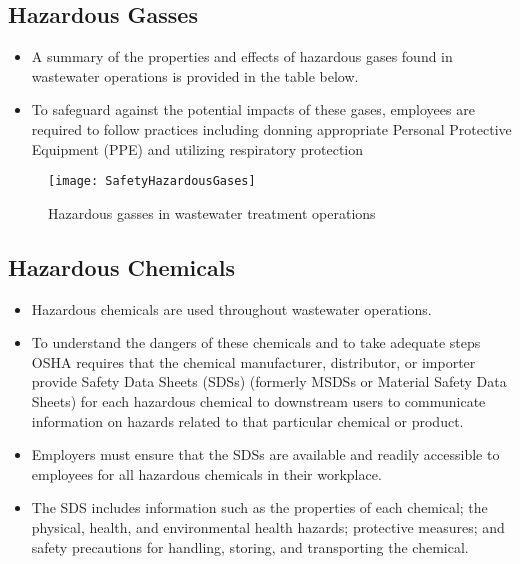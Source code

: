 \subsection{Hazardous Gasses}
\begin{itemize}
\item A summary of the properties and effects of hazardous gases found in wastewater operations is provided in the table below.
\item To safeguard against the potential impacts of these gases, employees are required to follow practices including donning appropriate Personal Protective Equipment (PPE) and utilizing respiratory protection\\
\end{itemize}
\begin{figure}[H]
\begin{center}

\texttt{[image: SafetyHazardousGases]}\\ 
\caption{Hazardous gasses in wastewater treatment operations}
\end{center}

\end{figure}
\newpage
\subsection{Hazardous Chemicals}
\begin{itemize}
\item Hazardous chemicals are used throughout wastewater operations.
\item To understand the dangers of these chemicals and to take adequate steps OSHA requires that the chemical manufacturer, distributor, or importer provide Safety Data Sheets (SDSs) (formerly MSDSs or Material Safety Data Sheets) for each hazardous chemical to downstream users to communicate information on hazards related to that particular chemical or product.
\item Employers must ensure that the SDSs are available and readily accessible to employees for all hazardous chemicals in their workplace.
\item The SDS includes information such as the properties of each chemical; the physical, health, and environmental health hazards; protective measures; and safety precautions for handling, storing, and transporting the chemical.\\
\end{itemize}



